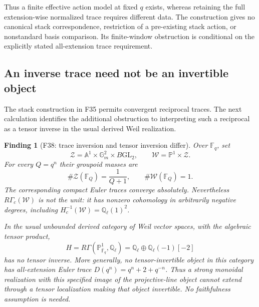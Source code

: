 \documentclass[11pt,a4paper]{article}
\newcommand{\Q}{\mathbb Q}\newcommand{\Z}{\mathbb Z}\newcommand{\C}{\mathbb C}\newcommand{\N}{\mathbb N}\newcommand{\F}{\mathbb F}
\newcommand{\A}{\mathbb A}\newcommand{\PP}{\mathbb P}\newcommand{\GL}{\mathrm{GL}}
\newcommand{\fid}[1]{\textsf{#1}}\newcommand{\gate}[1]{\textsf{#1}}
\theoremstyle{named}\newtheorem{finding}{Finding}[section]
\theoremstyle{definition}\newtheorem{definition}[finding]{Definition}
\theoremstyle{remark}\newtheorem{remark}[finding]{Remark}
\begin{document}
Thus a finite effective action model at fixed $q$ exists,
whereas retaining the full extension-wise normalized trace
requires different data. The construction gives no canonical
stack correspondence, restriction of a pre-existing stack
action, or nonstandard basis comparison. Its finite-window
obstruction is conditional on the explicitly stated
all-extension trace requirement.


\subsection{An inverse trace need not be an invertible object}
The stack construction in \fid{F35} permits convergent reciprocal
traces. The next calculation identifies the additional obstruction
to interpreting such a reciprocal as a tensor inverse in the usual
derived Weil realization.

\begin{finding}[\fid{F38}: trace inversion and tensor inversion differ]\label{f:traceinverse}
Over $\F_q$, set
\[
 \mathcal Z=\A^1\times\mathbb G_m^2\times B\GL_2,
 \qquad \mathcal W=\mathbb P^1\times\mathcal Z.
\]
For every $Q=q^n$ their groupoid masses are
\[
 \#\mathcal Z(\F_Q)=\frac1{Q+1},\qquad
 \#\mathcal W(\F_Q)=1.
\]
The corresponding compact Euler traces converge absolutely.
Nevertheless $R\Gamma_c(\mathcal W)$ is not the unit: it has
nonzero cohomology in arbitrarily negative degrees, including
$H_c^{-1}(\mathcal W)=\Q_\ell(1)^2$.

In the usual unbounded derived category of Weil vector spaces,
with the algebraic tensor product,
\[
 H=R\Gamma(\mathbb P^1_{\bar{\F}_q},\Q_\ell)
   =\Q_\ell\oplus\Q_\ell(-1)[-2]
\]
has no tensor inverse. More generally, no tensor-invertible object
in this category has all-extension Euler trace
$D(q^n)=q^n+2+q^{-n}$.
Thus a strong monoidal realization with this specified image of
the projective-line object cannot extend through a tensor localization
making that object invertible. No faithfulness assumption is needed.
\end{finding}
\end{document}
